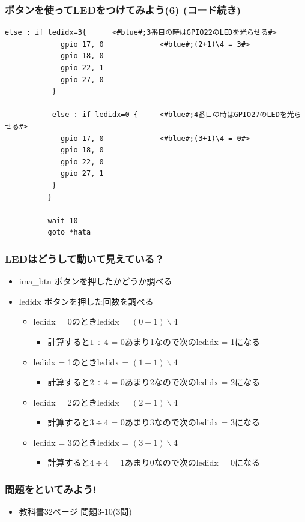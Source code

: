 \begin{frame}[fragile]
  \frametitle{ボタンを使ってLEDをつけてみよう(6) (コード続き)}
  \begin{lstlisting}[title=button\_led3.hsp, label=button_led3.hsp]
           else : if ledidx=3{      <#blue#;3番目の時はGPIO22のLEDを光らせる#>
             gpio 17, 0             <#blue#;(2+1)\4 = 3#>
             gpio 18, 0
             gpio 22, 1
             gpio 27, 0
           }

           else : if ledidx=0 {     <#blue#;4番目の時はGPIO27のLEDを光らせる#>
             gpio 17, 0             <#blue#;(3+1)\4 = 0#>
             gpio 18, 0
             gpio 22, 0
             gpio 27, 1
           }
          }

          wait 10
          goto *hata
  \end{lstlisting}
\end{frame}

\begin{frame}
  \frametitle{LEDはどうして動いて見えている？}
  \begin{itemize}
    \item ima\_btn ボタンを押したかどうか調べる
    \item ledidx ボタンを押した回数を調べる
    \begin{itemize}
      \item ledidx = 0のときledidx = $(0+1)\backslash4$
      \begin{itemize}
        \item 計算すると$1\div4$ = 0あまり1なので次のledidx = 1になる
      \end{itemize}
      \item ledidx = 1のときledidx = $(1+1)\backslash4$ 
      \begin{itemize}
        \item 計算すると$2\div4$ = 0あまり2なので次のledidx = 2になる 
      \end{itemize}
      \item ledidx = 2のときledidx = $(2+1)\backslash4$ 
      \begin{itemize}
        \item 計算すると$3\div4$ = 0あまり3なので次のledidx = 3になる
      \end{itemize}
      \item ledidx = 3のときledidx = $(3+1)\backslash4$ 
      \begin{itemize}
        \item 計算すると$4\div4$ = 1あまり0なので次のledidx = 0になる
      \end{itemize}
    \end{itemize}
  \end{itemize}
\end{frame}

\begin{frame}
  \frametitle{問題をといてみよう!}
  \begin{itemize}
    \item 教科書32ページ 問題3-10(3問)
  \end{itemize}
\end{frame}
